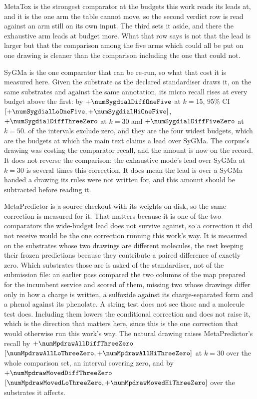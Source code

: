 \documentclass[journal=jcisd8,manuscript=suppinfo,layout=onecolumn]{achemso}
\begin{document}


MetaTox is the strongest comparator at the budgets this work reads its leads at, and it is the one
arm the table cannot move, so the second verdict row is read against an arm still on its own
input. The third sets it aside, and there the exhaustive arm leads at
\numEqualisedDifferswithoutmetatoxWord{} budget more. What that row says is not that the lead is
larger but that the comparison among the five arms which could all be put on one drawing is
cleaner than the comparison including the one that could not.

SyGMa is the one comparator that can be re-run, so what that cost it is measured here. Given the
substrate as the declared standardiser draws it, on the same \numSygdialN{}
substrates and against the same annotation, its micro recall rises at every budget above the
first: by $+\numSygdialDiffOneFive$ at $k=15$, $95\%$ CI
$[+\numSygdialLoOneFive, +\numSygdialHiOneFive]$, $+\numSygdialDiffThreeZero$ at $k=30$ and
$+\numSygdialDiffFiveZero$ at $k=50$. \numSygdialSeparating{} of the \numSygdialBudgets{}
intervals exclude zero, and they are the four widest budgets, which are the budgets at which
the main text claims a lead over SyGMa. The corpus's drawing was costing the comparator recall,
and the amount is now on the record. It does not reverse the comparison: the exhaustive mode's
lead over SyGMa at $k=30$ is several times this correction. It does mean the lead is over a SyGMa
handed a drawing its rules were not written for, and this amount should be subtracted before reading
it.

MetaPredictor is a source checkout with its weights on disk, so the same correction is measured
for it. That matters because it is one of the two comparators the wide-budget lead does not survive
against, so a correction it did not receive would be the one correction running this work's way.
It is measured on the \numMpdrawRerun{} substrates whose two drawings are different molecules, the
rest keeping their frozen predictions because they contribute a paired difference of exactly
zero. Which substrates those are is asked of the standardiser, not of the submission file: an
earlier pass compared the two columns of the map prepared for the incumbent service and scored
\numMpdrawRerunOld{} of them, missing two whose drawings differ only in how a charge is written, a
sulfoxide against its charge-separated form and a phenol against its phenolate. A string test does
not see those and a molecule test does. Including them lowers the conditional correction and does
not raise it, which is the direction that matters here, since this is the one correction that
would otherwise run this work's way. The natural drawing raises MetaPredictor's recall by
$+\numMpdrawAllDiffThreeZero$ $[\numMpdrawAllLoThreeZero, +\numMpdrawAllHiThreeZero]$ at $k=30$
over the whole comparison set, an interval covering zero, and by
$+\numMpdrawMovedDiffThreeZero$ $[\numMpdrawMovedLoThreeZero, +\numMpdrawMovedHiThreeZero]$
over the \numMpdrawMovedN{} substrates it affects.
\end{document}
